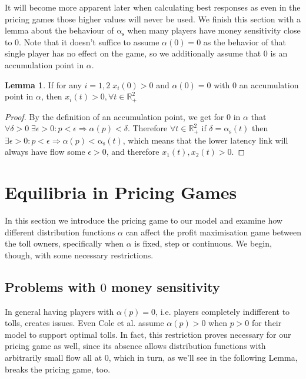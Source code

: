 \documentclass[10pt,a4paper]{book}
\newcommand{\as}{\mathrm{\alpha_s}}
\newcommand{\R}{\mathbb{R}}
\theoremstyle{definition}
\newtheorem{lemma}[definition]{Lemma}
\theoremstyle{comment}
\begin{document}
It will become more apparent later when calculating best responses as even in the pricing games those higher values will never be used.
We finish this section with a lemma about the behaviour of $\as$ when many players have money sensitivity close to 0.
Note that it doesn't suffice to assume $\alpha(0) = 0$ as the behavior of that single player has no effect on the game, so we additionally assume that $0$ is an accumulation point in $\alpha$.
\begin{lemma}
	If for any $i = 1, 2 \; x_i(0) > 0$ and $\alpha(0) = 0$ with $0$ an accumulation point in $\alpha$, then $x_i(t) > 0, \forall t \in \R_+^2$
\end{lemma}

\begin{proof}
	By the definition of an accumulation point, we get for $0$ in $\alpha$ that $\forall \delta > 0 \; \exists \epsilon > 0: p < \epsilon \Rightarrow \alpha(p) < \delta$.
	Therefore $\forall t \in \R_+^2$ if $\delta = \as(t)$ then $\exists \epsilon > 0: p < \epsilon \Rightarrow \alpha(p) < \as(t)$, which means that the lower latency link will always have flow some $\epsilon > 0$, and therefore $x_1(t), x_2(t) > 0$.
\end{proof}

\cleardoublepage


\chapter{Equilibria in Pricing Games}
\label{chapter:pricing_equilibria}

In this section we introduce the pricing game to our model and examine how different distribution functions $\alpha$ can affect the profit maximisation game between the toll owners, specifically when $\alpha$ is fixed, step or continuous.
We begin, though, with some necessary restrictions.

\section{Problems with $0$ money sensitivity}

In general having players with $\alpha(p) = 0$, i.e. players completely indifferent to tolls, creates issues.
Even Cole et al. \cite{10.1145/780542.780618} assume $\alpha(p) > 0$ when $p > 0$ for their model to support optimal tolls.
In fact, this restriction proves necessary for our pricing game as well, since its absence allows distribution functions with arbitrarily small flow all at $0$, which in turn, as we'll see in the following Lemma, breaks the pricing game, too.
\end{document}
